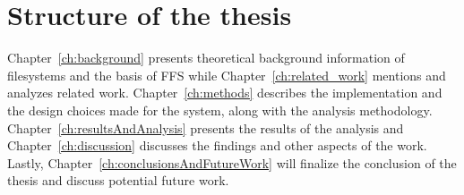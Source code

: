 \section{Structure of the thesis} %
Chapter~\ref{ch:background} presents theoretical background information of filesystems and the basis of FFS while Chapter~\ref{ch:related_work} mentions and analyzes related work. Chapter~\ref{ch:methods} describes the implementation and the design choices made for the system, along with the analysis methodology. Chapter~\ref{ch:resultsAndAnalysis} presents the results of the analysis and Chapter~\ref{ch:discussion} discusses the findings and other aspects of the work. Lastly, Chapter~\ref{ch:conclusionsAndFutureWork} will finalize the conclusion of the thesis and discuss potential future work.